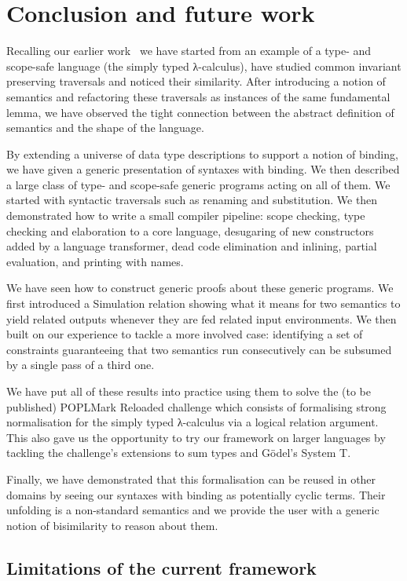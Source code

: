 {\section{Conclusion and future work}

Recalling our earlier work~\citeyear{allais2017type}
we have started from an example of a type- and scope-safe language (the simply typed
λ-calculus), have studied common invariant preserving traversals and noticed their
similarity. After introducing a notion of semantics and refactoring these traversals as
instances of the same fundamental lemma, we have observed the tight
connection between the abstract definition of semantics and the shape of the
language.

By extending a universe of data type descriptions to support a notion of binding,
we have given a generic presentation of syntaxes with binding. We then described
a large class of type- and scope-safe generic programs acting on all of them.
We started with syntactic traversals such as renaming and substitution. We then
demonstrated how to write a small compiler pipeline: scope checking, type checking
and elaboration to a core language, desugaring of new constructors added by a language
transformer, dead code elimination and inlining, partial evaluation, and printing
with names.

We have seen how to construct generic proofs about these generic programs. We
first introduced a Simulation relation showing what it means for two semantics
to yield related outputs whenever they are fed related input environments. We
then built on our experience to tackle a more involved case: identifying a set
of constraints guaranteeing that two semantics run consecutively can be subsumed
by a single pass of a third one.

We have put all of these results into practice using them to solve the (to be
published) POPLMark Reloaded challenge which consists of formalising strong
normalisation for the simply typed λ-calculus via a logical relation
argument. This also gave us the opportunity to try our framework on larger
languages by tackling the challenge's extensions to sum types and G\"{o}del's
System T.

Finally, we have demonstrated that this formalisation can be reused
in other domains by seeing our syntaxes with binding as potentially cyclic
terms. Their unfolding is a non-standard semantics and we provide the
user with a generic notion of bisimilarity to reason about them.

\subsection{Limitations of the current framework}

}
